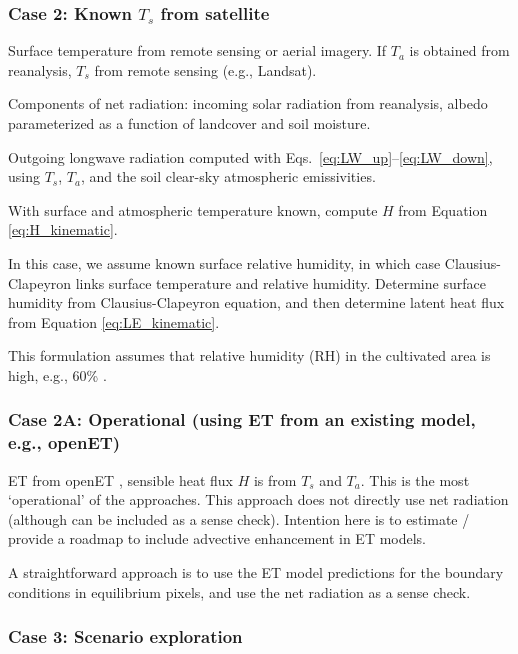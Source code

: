 \documentclass{article}
\begin{document}
    \subsubsection*{Case 2: Known $T_s$ from satellite}
    
    Surface temperature from remote sensing or aerial imagery. 
    If $T_a$ is obtained from reanalysis, $T_s$ from remote sensing (e.g., Landsat).
    
    Components of net radiation: 
    incoming solar radiation from reanalysis,   albedo parameterized as a function of landcover and soil moisture. 
    
    Outgoing longwave radiation computed  with Eqs.~\ref{eq:LW_up}–\ref{eq:LW_down}, using $T_s$, $T_a$, and the soil clear-sky atmospheric emissivities.
    
    With surface and atmospheric temperature known, compute $H$ from  Equation \ref{eq:H_kinematic}.
    
     In this case, we assume known surface relative humidity, in which case Clausius-Clapeyron links surface temperature and relative humidity.  
    Determine surface humidity from Clausius-Clapeyron equation, 
    and then determine latent heat flux from Equation \ref{eq:LE_kinematic}.
    
    This formulation assumes that relative humidity (RH) in the cultivated area is high, e.g., 60\% \cite{rao1974local}. 
    
    \subsubsection*{Case 2A: Operational (using ET from an existing model, e.g., openET)}
    
     ET from openET \cite{melton_openet_nodate}, 
     sensible heat flux $H$ is from $T_s$ and $T_a$.
     This is the most `operational' of the approaches. 
     This approach does not directly use net radiation (although can be included as a sense check). 
     Intention here is to estimate / provide a roadmap to include advective enhancement in ET models. 
    
    A straightforward approach is to use the ET model predictions for the boundary conditions in equilibrium pixels, and use the net radiation as a sense check.
    
    \subsubsection*{Case 3: Scenario exploration}
    
\end{document}
